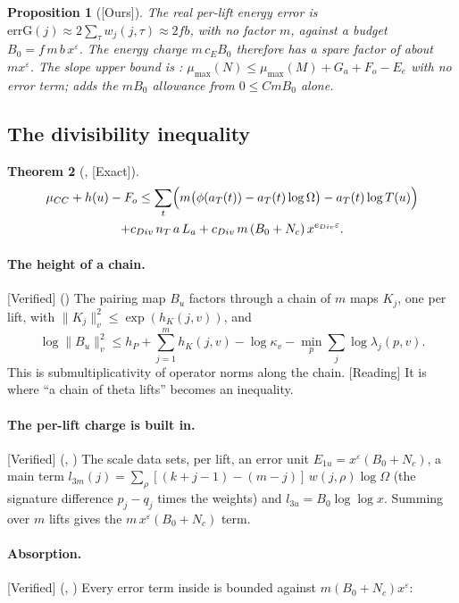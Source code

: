 \documentclass[11pt]{article}
\newcommand{\Exact}{\textcolor{exactc}{\textsf{\small[Exact]}}}
\newcommand{\Verified}{\textcolor{verc}{\textsf{\small[Verified]}}}
\newcommand{\Reading}{\textcolor{readc}{\textsf{\small[Reading]}}}
\newcommand{\Ours}{\textcolor{oursc}{\textsf{\small[Ours]}}}
\newcommand{\eps}{\varepsilon}
\theoremstyle{plain}
\newtheorem{theorem}{Theorem}[section]
\newtheorem{proposition}[theorem]{Proposition}
\theoremstyle{definition}
\begin{document}
\begin{proposition}[\Ours]
The real per-lift energy error is $\mathrm{errG}(j)\approx 2\sum_\tau w_j(j,\tau)\approx 2fb$,
with no factor $m$, against a budget $B_0=f\,m\,b\,x^\eps$. The energy charge $m\,c_E B_0$ therefore
has a spare factor of about $m x^\eps$. The slope upper bound is :
$\mu_{\max}(N)\le\mu_{\max}(M)+G_a+F_o-E_e$ with \emph{no} error term;  adds the
$m B_0$ allowance from $0\le C m B_0$ alone.
\end{proposition}

\subsection{The divisibility inequality}

\begin{theorem}[, \Exact]\label{thm:DIV}
\begin{multline*}
\mu_{CC}+h(u)-F_o \le \sum_t\Bigl(m\bigl(\phi(a_T(t))-a_T(t)\log\Omega\bigr)-a_T(t)\log T(u)\Bigr)\\
+ c_{Div}\,n_T\,a\,L_a + c_{Div}\,m\,(B_0+N_c)\,x^{e_{Div}\eps}.
\end{multline*}
\end{theorem}

\paragraph{The height of a chain.} \Verified{} () The pairing map $B_u$
factors through a chain of $m$ maps $K_j$, one per lift, with $\|K_j\|_v^2\le\exp(h_K(j,v))$, and
\[
\log\|B_u\|_v^2\le h_P+\sum_{j=1}^m h_K(j,v)-\log\kappa_v-\min_p\sum_j\log\lambda_j(p,v).
\]
This is submultiplicativity of operator norms along the chain. \Reading{} It is where ``a chain of
theta lifts'' becomes an inequality.

\paragraph{The per-lift charge is built in.} \Verified{} (, )
The scale data sets, per lift, an error unit $E_{1u}=x^\eps(B_0+N_c)$, a main term
$l_{3m}(j)=\sum_\rho[(k+j-1)-(m-j)]\,w(j,\rho)\log\Omega$ (the signature difference $p_j-q_j$ times
the weights) and $l_{3u}=B_0\log\log x$. Summing over $m$ lifts gives the $m\,x^\eps(B_0+N_c)$ term.

\paragraph{Absorption.} \Verified{} (, )
Every error term inside  is bounded against $m(B_0+N_c)x^\eps$:
\end{document}

